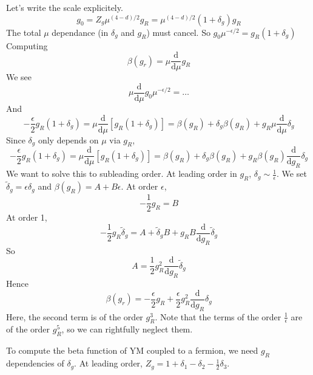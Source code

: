 \documentclass[a4paper]{book}
\theoremstyle{definition}
\theoremstyle{remark}
\begin{document}
Let's write the scale explicitely. 
\begin{equation}
    g_0 = Z_g \mu ^{(4-d)/2}g_R = \mu^{(4-d)/2}(1 + \delta_g)g_R
\end{equation}
The total $\mu$ dependance (in $\delta_g$ and $g_R$) must cancel. So $g_0 \mu^{-\epsilon /2} = g_R(1+\delta_g)$
Computing 
\begin{equation}
            \beta(g_r) = \mu \frac{\text{d}}{\text{d}\mu}g_R
\end{equation}
We see 
\begin{equation}
    \mu \frac{\text{d}}{\text{d}\mu}g_0 \mu^{-\epsilon /2} = \dots 
\end{equation}
And 
\begin{equation}
    -\frac{\epsilon}{2}g_R (1 + \delta_g) = \mu \frac{\text{d}}{\text{d}\mu}[g_R (1 + \delta_g)] = \beta(g_R) + \delta_g \beta(g_R) + g_R \mu \frac{\text{d}}{\text{d}\mu} \delta_g
\end{equation}
Since $\delta_g$ only depends on $\mu$ via $g_R$, 
\begin{equation}
    -\frac{\epsilon}{2}g_R (1 + \delta_g) = \mu \frac{\text{d}}{\text{d}\mu}[g_R (1 + \delta_g)] = \beta(g_R) + \delta_g \beta(g_R) + g_R \beta(g_R) \frac{\text{d}}{\text{d}g_R} \delta_g
\end{equation}
We want to solve this to subleading order. At leading order in $g_R$, $\delta_g \sim \frac{1}{\epsilon}$. We set $\tilde\delta_g = \epsilon \delta_g$ and $\beta(g_R) = A + B\epsilon$. At order $\epsilon$, 
\begin{equation}
    -\frac{1}{2}g_R = B 
\end{equation}
At order 1, 
\begin{equation}
    -\frac{1}{2}g_R \tilde \delta_g = A + \tilde \delta_g B + g_R B \frac{\text{d}}{\text{d}g_R} \tilde \delta_g
\end{equation}
So 
\begin{equation}
    A = \frac{1}{2}g_R^2 \frac{\text{d}}{\text{d}g_R} \tilde{\delta}_g
\end{equation}
Hence 
\begin{equation}
    \beta(g_r) = -\frac{\epsilon}{2}g_R + \frac{\epsilon}{2} g^2_R \frac{\text{d}}{\text{d}g_R}\delta_g
\end{equation}
Here, the second term is of the order $g_R^3$. Note that the terms of the order $\frac{1}{\epsilon}$ are of the order $g_R^5$, so we can rightfully neglect them. \par \medskip 

To compute the beta function of YM coupled to a fermion, we need $g_R$ dependencies of $\delta_g$. At leading order, $Z_g = 1 + \delta_1 - \delta_2 -\frac{1}{2}\delta_3$. 
\end{document}
